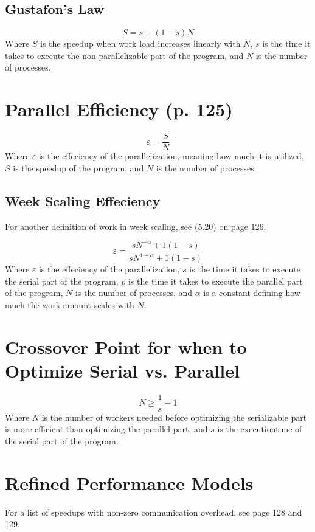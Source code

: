 \documentclass{article}
\begin{document}
		\subsection{Gustafon's Law}
			\begin{equation}
				S=s+(1-s)N
			\end{equation}
			Where $S$ is the speedup when work load increases linearly with $N$, $s$ is the time it takes to execute the non-parallelizable part of the program, and $N$ is the number of processes.
	
	\section{Parallel Efficiency (p. 125)}
		\begin{equation}
			\varepsilon=\frac{S}{N}
		\end{equation}
		Where $\varepsilon$ is the effeciency of the parallelization, meaning how much it is utilized, $S$ is the speedup of the program, and $N$ is the number of processes.

		\subsection{Week Scaling Effeciency}
			For another definition of work in week scaling, see (5.20) on page 126.

			\begin{equation}
				\varepsilon=\frac{sN^{-\alpha}+1(1-s)}{sN^{1-\alpha}+1(1-s)}
			\end{equation}
			Where $\varepsilon$ is the effeciency of the parallelization, $s$ is the time it takes to execute the serial part of the program, $p$ is the time it takes to execute the parallel part of the program, $N$ is the number of processes, and $\alpha$ is a constant defining how much the work amount scales with $N$.
	
	\section{Crossover Point for when to Optimize Serial vs. Parallel}
			\begin{equation}
				N\geq\frac{1}{s}-1
			\end{equation}
			Where $N$ is the number of workers needed before optimizing the serializable part is more efficient than optimizing the parallel part, and $s$ is the executiontime of the serial part of the program.
	
	\section{Refined Performance Models}
			For a list of speedups with non-zero communication overhead, see page 128 and 129.
\end{document}
